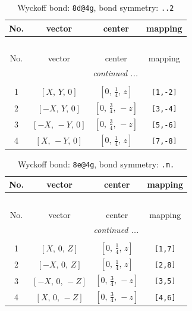 \documentclass[fleqn,8pt]{jsarticle}
\begin{document}
\begin{longtable}{cccc}
\caption{Wyckoff bond: {\tt 8d@4g}, bond symmetry: {\tt ..2}}
 \\
 \hline \hline
No. & vector & center & mapping \\ \hline \endfirsthead

\multicolumn{3}{l}{\tablename\ \thetable{}} \\
 \hline \hline
No. & vector & center & mapping \\ \hline \endhead

 \hline \hline
\multicolumn{3}{r}{\footnotesize\it continued ...} \\ \endfoot

 \hline \hline
\multicolumn{3}{r}{} \\ \endlastfoot

1 & $\left[ X,\, Y,\, 0 \right]$ & $\left[ 0,\, \frac{1}{4},\, z \right]$ & {\tt [1,-2]} \\ \hline
2 & $\left[ - X,\, Y,\, 0 \right]$ & $\left[ 0,\, \frac{3}{4},\, - z \right]$ & {\tt [3,-4]} \\ \hline
3 & $\left[ - X,\, - Y,\, 0 \right]$ & $\left[ 0,\, \frac{3}{4},\, - z \right]$ & {\tt [5,-6]} \\ \hline
4 & $\left[ X,\, - Y,\, 0 \right]$ & $\left[ 0,\, \frac{1}{4},\, z \right]$ & {\tt [7,-8]} \\
\end{longtable}
\renewcommand{\arraystretch}{1.2}
\begin{longtable}{cccc}
\caption{Wyckoff bond: {\tt 8e@4g}, bond symmetry: {\tt .m.}}
 \\
 \hline \hline
No. & vector & center & mapping \\ \hline \endfirsthead

\multicolumn{3}{l}{\tablename\ \thetable{}} \\
 \hline \hline
No. & vector & center & mapping \\ \hline \endhead

 \hline \hline
\multicolumn{3}{r}{\footnotesize\it continued ...} \\ \endfoot

 \hline \hline
\multicolumn{3}{r}{} \\ \endlastfoot

1 & $\left[ X,\, 0,\, Z \right]$ & $\left[ 0,\, \frac{1}{4},\, z \right]$ & {\tt [1,7]} \\ \hline
2 & $\left[ - X,\, 0,\, Z \right]$ & $\left[ 0,\, \frac{1}{4},\, z \right]$ & {\tt [2,8]} \\ \hline
3 & $\left[ - X,\, 0,\, - Z \right]$ & $\left[ 0,\, \frac{3}{4},\, - z \right]$ & {\tt [3,5]} \\ \hline
4 & $\left[ X,\, 0,\, - Z \right]$ & $\left[ 0,\, \frac{3}{4},\, - z \right]$ & {\tt [4,6]} \\
\end{longtable}
\end{document}
